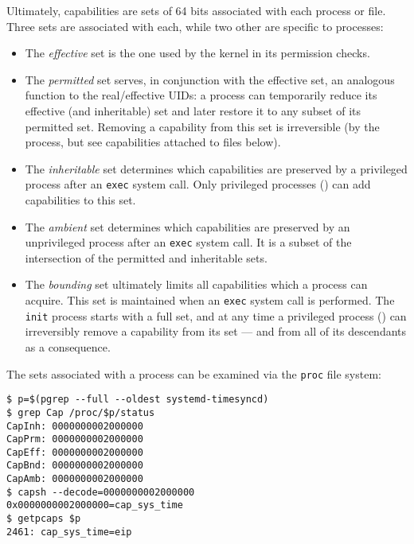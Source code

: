 Ultimately, capabilities are sets of 64 bits associated with each process or
file.  Three sets are associated with each, while two other are specific to
processes:

\begin{itemize}
    \item
        The \textit{effective} set is the one used by the kernel in its
        permission checks.
    \item
        The \textit{permitted} set serves, in conjunction with the effective
        set, an analogous function to the real/effective UIDs: a process can
        temporarily reduce its effective (and inheritable) set and later restore
        it to any subset of its permitted set.  Removing a capability from this
        set is irreversible (by the process, but see capabilities attached to
        files below).
    \item
        The \textit{inheritable} set determines which capabilities are preserved
        by a privileged process after an \texttt{exec} system call\footnotemark.
        Only privileged processes () can add capabilities to
        this set.
    \item
        The \textit{ambient} set determines which capabilities are preserved by
        an unprivileged process after an \texttt{exec} system call.  It is a
        subset of the intersection of the permitted and inheritable sets.
    \item
        The \textit{bounding} set ultimately limits all capabilities which a
        process can acquire.  This set is maintained when an \texttt{exec}
        system call is performed.  The \texttt{init} process starts with a full
        set, and at any time a privileged process () can
        irreversibly remove a capability from its set --- and from all of its
        descendants as a consequence.
\end{itemize}


The sets associated with a process can be examined via the \texttt{proc} file
system:

\begin{lstlisting}
$ p=$(pgrep --full --oldest systemd-timesyncd)
$ grep Cap /proc/$p/status
CapInh: 0000000002000000
CapPrm: 0000000002000000
CapEff: 0000000002000000
CapBnd: 0000000002000000
CapAmb: 0000000002000000
$ capsh --decode=0000000002000000
0x0000000002000000=cap_sys_time
$ getpcaps $p
2461: cap_sys_time=eip
\end{lstlisting} %

